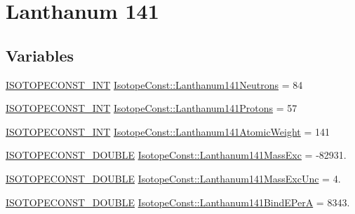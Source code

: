 \hypertarget{group___isotope_const-_lanthanum-_la141}{}\section{Lanthanum 141}
\label{group___isotope_const-_lanthanum-_la141}
\subsection*{Variables}
\begin{DoxyCompactItemize}
\item 
\mbox{\hyperlink{group___isotope_const-_macros_ga5f18360b3e99483a35c32d789e62621c}{I\+S\+O\+T\+O\+P\+E\+C\+O\+N\+S\+T\+\_\+\+I\+NT}} \mbox{\hyperlink{group___isotope_const-_lanthanum-_la141_ga8db316c02667895da6ffc07b962f9ae6}{Isotope\+Const\+::\+Lanthanum141\+Neutrons}} = 84
\item 
\mbox{\hyperlink{group___isotope_const-_macros_ga5f18360b3e99483a35c32d789e62621c}{I\+S\+O\+T\+O\+P\+E\+C\+O\+N\+S\+T\+\_\+\+I\+NT}} \mbox{\hyperlink{group___isotope_const-_lanthanum-_la141_ga071fd64ad77a82f4d55c700b93b1821c}{Isotope\+Const\+::\+Lanthanum141\+Protons}} = 57
\item 
\mbox{\hyperlink{group___isotope_const-_macros_ga5f18360b3e99483a35c32d789e62621c}{I\+S\+O\+T\+O\+P\+E\+C\+O\+N\+S\+T\+\_\+\+I\+NT}} \mbox{\hyperlink{group___isotope_const-_lanthanum-_la141_ga2aeb91ddd4220ae60cf8d4d124f5775e}{Isotope\+Const\+::\+Lanthanum141\+Atomic\+Weight}} = 141
\item 
\mbox{\hyperlink{group___isotope_const-_macros_ga8f45a7272ce02c0b4c65c44636ed719a}{I\+S\+O\+T\+O\+P\+E\+C\+O\+N\+S\+T\+\_\+\+D\+O\+U\+B\+LE}} \mbox{\hyperlink{group___isotope_const-_lanthanum-_la141_ga4c9fb15909ca1a39456ec6971c411d79}{Isotope\+Const\+::\+Lanthanum141\+Mass\+Exc}} = -\/82931.
\item 
\mbox{\hyperlink{group___isotope_const-_macros_ga8f45a7272ce02c0b4c65c44636ed719a}{I\+S\+O\+T\+O\+P\+E\+C\+O\+N\+S\+T\+\_\+\+D\+O\+U\+B\+LE}} \mbox{\hyperlink{group___isotope_const-_lanthanum-_la141_ga2130cb0c0bbf58bfd945e206bfc31260}{Isotope\+Const\+::\+Lanthanum141\+Mass\+Exc\+Unc}} = 4.
\item 
\mbox{\hyperlink{group___isotope_const-_macros_ga8f45a7272ce02c0b4c65c44636ed719a}{I\+S\+O\+T\+O\+P\+E\+C\+O\+N\+S\+T\+\_\+\+D\+O\+U\+B\+LE}} \mbox{\hyperlink{group___isotope_const-_lanthanum-_la141_ga31fe386860943d001b45892e5d6d67d2}{Isotope\+Const\+::\+Lanthanum141\+Bind\+E\+PerA}} = 8343.
\item 

\end{DoxyCompactItemize}
